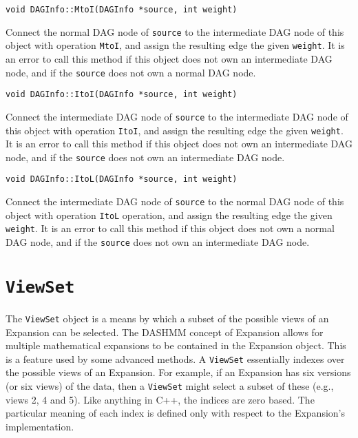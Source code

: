 \begin{lstlisting}
void DAGInfo::MtoI(DAGInfo *source, int weight)
\end{lstlisting}

\noindent Connect the normal DAG node of \texttt{source} to the intermediate
DAG node of this object with operation \texttt{MtoI}, and assign the
resulting edge the given \texttt{weight}. It is an error to call this method
if this object does not own an intermediate DAG node, and if the
\texttt{source} does not own a normal DAG node.

\begin{lstlisting}
void DAGInfo::ItoI(DAGInfo *source, int weight)
\end{lstlisting}

\noindent Connect the intermediate DAG node of \texttt{source} to the
intermediate DAG node of this object with operation \texttt{ItoI}, and
assign the resulting edge the given \texttt{weight}. It is an error to call
this method if this object does not own an intermediate DAG node, and if the
\texttt{source} does not own an intermediate DAG node.

\begin{lstlisting}
void DAGInfo::ItoL(DAGInfo *source, int weight)
\end{lstlisting}

\noindent Connect the intermediate DAG node of \texttt{source} to the normal
DAG node of this object with operation \texttt{ItoL} operation, and assign
the resulting edge the given \texttt{weight}. It is an error to call this
method if this object does not own a normal DAG node, and if the
\texttt{source} does not own an intermediate DAG node.



\section{\texttt{ViewSet}}

The \texttt{ViewSet} object is a means by which a subset of the possible views
of an Expansion can be selected. The DASHMM concept of Expansion allows for
multiple mathematical expansions to be contained in the Expansion object. This
is a feature used by some advanced methods. A \texttt{ViewSet} essentially
indexes over the possible views of an Expansion. For example, if an
Expansion has six versions (or six views) of the data, then a \texttt{ViewSet}
might select a subset of these (e.g., views 2, 4 and 5). Like anything in C++,
the indices are zero based. The particular meaning of each index is defined
only with respect to the Expansion's implementation.

